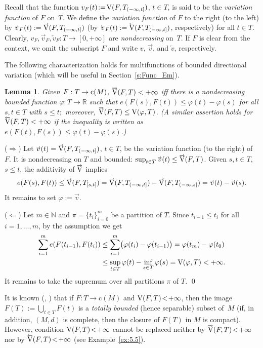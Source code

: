 \documentclass[preprint,12pt]{elsarticle}
\newtheorem{lem}{Lemma}
\newcommand{\Rb}{\mathbb{R}}  \newcommand{\Nb}{\mathbb{N}}
\newcommand{\nV}{\mbox{\rm V}}
\newcommand{\riV}{{\scriptstyle\overrightarrow{\mbox{\rm V}}}}
\newcommand{\leV}{{\scriptstyle\overleftarrow{\mbox{\rm V}}}}
\newcommand{\ori}[1]{{\scriptscriptstyle\overrightarrow{\mbox{$#1$}}}}
\newcommand{\ole}[1]{{\scriptscriptstyle\overleftarrow{\mbox{$#1$}}}}
\begin{document}
Recall that the function $v_F(t)\!:=\!\nV(F,T_{(-\infty,t]})$, $t\!\in\! T$, is said to be
the {\it var\-i\-a\-tion function\/} of $F$ on~$T$. 
We define the \emph{variation function\/} of $F$ to the right (to the left) by
$\ori{v}_F(t):=\riV(F,T_{(-\infty,t]})$ (by $\ole{v}_F(t):=\leV(F,T_{(-\infty,t]})$,
respectively) for all $t\in T$. Clearly, $v_F,\ori{v}_F,\ole{v}_F:T\to[0,+\infty]$ are
\emph{nondecreasing\/} on~$T$. If $F$ is clear from the context, we omit the
subscript $F$ and write $v$, $\ori{v}$, and $\ole{v}$, respectively.

The following characterization holds for multifunctions of bounded directional
variation (which will be useful in Section~\ref{s:Func_Em}).

\begin{lem} \label{l:char} Given $F:T\to\mbox{\rm c}(M)$, $\riV(F,T)<+\infty$ iff
there is a nondecreasing bounded function $\varphi:T\to\Rb$ such that
$e(F(s),F(t))\le\varphi(t)-\varphi(s)$ for all $s,t\in T$ with $s\le t;$ moreover,
$\riV(F,T)\le\nV(\varphi,T)$. {\rm(}A similar assertion holds for $\leV(F,T)<+\infty$ if
the inequality is written as $e(F(t),F(s))\le\varphi(t)-\varphi(s)$.{\rm)}
\end{lem}

\begin{pf}
($\Rightarrow\!$) Let $\ori{v}(t)=\riV(F,T_{(-\infty,t]})$, $t\in T$, be the variation
function (to the right) of~$F$. It is nondecreasing on $T$ and bounded:
$\sup_{t\in T}\ori{v}(t)\le\riV(F,T)$. Given $s,t\in T$, $s\le t$, the additivity
of $\riV$ implies
  \begin{equation*}
e(F(s),F(t))\le\riV(F,T_{[s,t]})=\riV(F,T_{(-\infty,t]})-\riV(F,T_{(-\infty,s]})
=\ori{v}(t)-\ori{v}(s).
  \end{equation*}
It remains to set $\varphi:=\ori{v}$.

($\!\Leftarrow$) Let $m\in\Nb$ and $\pi=\{t_i\}_{i=0}^m$ be a partition of $T$.
Since $t_{i-1}\le t_i$ for all $i=1,\dots,m$, by the assumption we get
  \begin{align*}
\sum_{i=1}^me(F(t_{i-1}),F(t_i))&\le\sum_{i=1}^m\bigl(\varphi(t_i)-\varphi(t_{i-1})\bigr)
  =\varphi(t_m)-\varphi(t_0)\\
&\le\sup_{t\in T}\varphi(t)-\inf_{s\in T}\varphi(s)=\nV(\varphi,T)<+\infty.
  \end{align*}
It remains to take the supremum over all partitions $\pi$ of $T$.
\qed\end{pf}

\begin{rem} \label{p:7}
It is known (\cite[1.23]{Var}, \cite[Lemma~11]{MZ}) that if $F:T\to\mbox{c}(M)$
and $\nV(F,T)\!<\!+\infty$, then the image $F(T):=\bigcup_{t\in T}F(t)$ is a
\emph{totally bounded\/} (hence separable) subset of~$M$ (if, in addition, $(M,d)$ is
complete, then the closure of $F(T)$ in $M$ is compact). However,
condition $\nV(F,T)\!<\!+\infty$ cannot be replaced neither by
$\riV(F,T)\!<\!+\infty$ nor by $\leV(F,T)\!<\!+\infty$ (see Example~\ref{ex:5.5}).
\end{rem}
\end{document}
